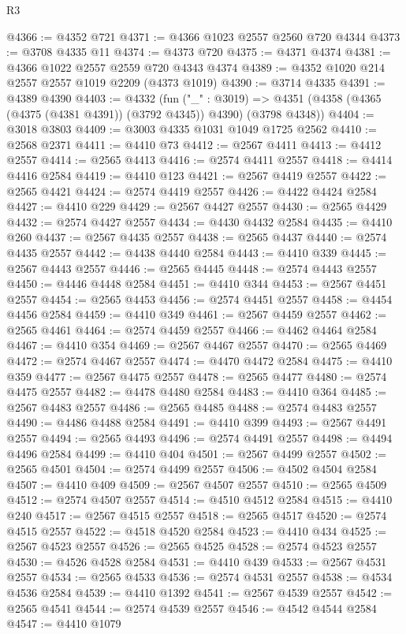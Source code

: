\begin{lexlean}{R3}
\begin{coremodule}
@4366 := @4352 @721
@4371 := @4366 @1023 @2557 @2560 @720 @4344
@4373 := @3708 @4335 @11
@4374 := @4373 @720
@4375 := @4371 @4374
@4381 := @4366 @1022 @2557 @2559 @720 @4343 @4374
@4389 := @4352 @1020 @214 @2557 @2557 @1019 @2209 (@4373 @1019)
@4390 := @3714 @4335
@4391 := @4389 @4390
@4403 := @4332
    (fun ("_" : @3019) =>
    @4351 (@4358 (@4365 (@4375 (@4381 @4391)) (@3792 @4345)) @4390) (@3798 @4348))
@4404 := @3018 @3803
@4409 := @3003 @4335 @1031 @1049 @1725 @2562
@4410 := @2568 @2371
@4411 := @4410 @73
@4412 := @2567 @4411
@4413 := @4412 @2557
@4414 := @2565 @4413
@4416 := @2574 @4411 @2557
@4418 := @4414 @4416 @2584
@4419 := @4410 @123
@4421 := @2567 @4419 @2557
@4422 := @2565 @4421
@4424 := @2574 @4419 @2557
@4426 := @4422 @4424 @2584
@4427 := @4410 @229
@4429 := @2567 @4427 @2557
@4430 := @2565 @4429
@4432 := @2574 @4427 @2557
@4434 := @4430 @4432 @2584
@4435 := @4410 @260
@4437 := @2567 @4435 @2557
@4438 := @2565 @4437
@4440 := @2574 @4435 @2557
@4442 := @4438 @4440 @2584
@4443 := @4410 @339
@4445 := @2567 @4443 @2557
@4446 := @2565 @4445
@4448 := @2574 @4443 @2557
@4450 := @4446 @4448 @2584
@4451 := @4410 @344
@4453 := @2567 @4451 @2557
@4454 := @2565 @4453
@4456 := @2574 @4451 @2557
@4458 := @4454 @4456 @2584
@4459 := @4410 @349
@4461 := @2567 @4459 @2557
@4462 := @2565 @4461
@4464 := @2574 @4459 @2557
@4466 := @4462 @4464 @2584
@4467 := @4410 @354
@4469 := @2567 @4467 @2557
@4470 := @2565 @4469
@4472 := @2574 @4467 @2557
@4474 := @4470 @4472 @2584
@4475 := @4410 @359
@4477 := @2567 @4475 @2557
@4478 := @2565 @4477
@4480 := @2574 @4475 @2557
@4482 := @4478 @4480 @2584
@4483 := @4410 @364
@4485 := @2567 @4483 @2557
@4486 := @2565 @4485
@4488 := @2574 @4483 @2557
@4490 := @4486 @4488 @2584
@4491 := @4410 @399
@4493 := @2567 @4491 @2557
@4494 := @2565 @4493
@4496 := @2574 @4491 @2557
@4498 := @4494 @4496 @2584
@4499 := @4410 @404
@4501 := @2567 @4499 @2557
@4502 := @2565 @4501
@4504 := @2574 @4499 @2557
@4506 := @4502 @4504 @2584
@4507 := @4410 @409
@4509 := @2567 @4507 @2557
@4510 := @2565 @4509
@4512 := @2574 @4507 @2557
@4514 := @4510 @4512 @2584
@4515 := @4410 @240
@4517 := @2567 @4515 @2557
@4518 := @2565 @4517
@4520 := @2574 @4515 @2557
@4522 := @4518 @4520 @2584
@4523 := @4410 @434
@4525 := @2567 @4523 @2557
@4526 := @2565 @4525
@4528 := @2574 @4523 @2557
@4530 := @4526 @4528 @2584
@4531 := @4410 @439
@4533 := @2567 @4531 @2557
@4534 := @2565 @4533
@4536 := @2574 @4531 @2557
@4538 := @4534 @4536 @2584
@4539 := @4410 @1392
@4541 := @2567 @4539 @2557
@4542 := @2565 @4541
@4544 := @2574 @4539 @2557
@4546 := @4542 @4544 @2584
@4547 := @4410 @1079

\end{coremodule}
\end{lexlean}
